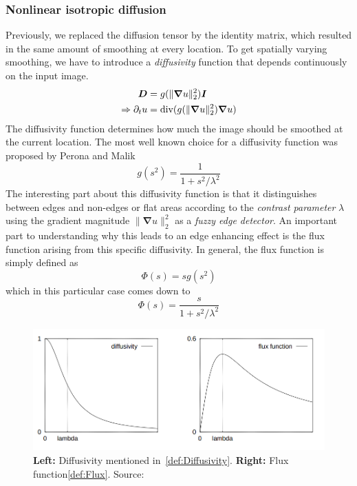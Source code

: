 \subsubsection*{Nonlinear isotropic diffusion}
Previously, we replaced the diffusion tensor by the identity matrix, which resulted in the same
amount of smoothing at every location.
To get spatially varying smoothing, we have to introduce a \textit{diffusivity} function that
depends continuously on the input image. 
\begin{align}
    \boldsymbol D &= g(\lVert\boldsymbol\nabla u\rVert_2^2)\boldsymbol I\\
    \Rightarrow \partial_t u & = \textnormal{div}(g(\lVert\boldsymbol\nabla u\rVert_2^2)\boldsymbol\nabla u)
\end{align}
The diffusivity function determines how much the image should be smoothed at the current location.
The most well known choice for a diffusivity function was proposed by Perona and Malik 
\cite{perona-malik}
\begin{equation}
    g(s^2) = \frac{1}{1 + s^2/\lambda^2}\label{def:Diffusivity}
\end{equation}
The interesting part about this diffusivity function is that it distinguishes between edges and
non-edges or flat areas according to the \textit{contrast parameter} $\lambda$ using the gradient
magnitude $\lVert\boldsymbol\nabla u\rVert_2^2$ as a \textit{fuzzy edge detector}\cite{dic18-04}. An important part
to understanding why this leads to an edge enhancing effect is the flux function
arising from this specific diffusivity. In general, the flux function is simply defined as 
\begin{equation}
    \Phi(s) = sg(s^2)
\end{equation}
which in this particular case comes down to
\begin{equation}
    \Phi(s) =\frac{s}{1 + s^2/\lambda^2}\label{def:Flux}
\end{equation}
\begin{figure}
    \includegraphics[width=\linewidth]{../Images/diffflux.png}
    \caption{\textbf{Left:} Diffusivity mentioned in~\eqref{def:Diffusivity}. \textbf{Right:} Flux
    function\eqref{def:Flux}. Source: \cite{dic18-04}}\label{fig:DiffFlux}
\end{figure}

